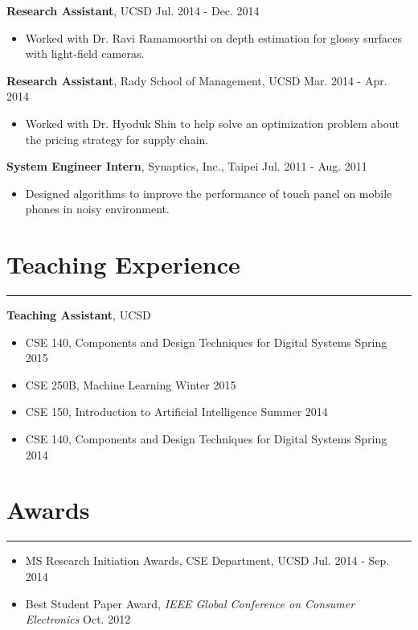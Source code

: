 \documentclass[10pt,letterpaper]{article}
\begin{document}
\noindent 
{\bf Research Assistant}, UCSD \hfill Jul. 2014 - Dec. 2014
\begin{itemize}
\item Worked with Dr. Ravi Ramamoorthi on depth estimation for glossy surfaces with light-field cameras.
\end{itemize}
\vspace{5pt}

\noindent 
{\bf Research Assistant}, Rady School of Management, UCSD \hfill Mar. 2014 - Apr. 2014
\begin{itemize}
\item Worked with Dr. Hyoduk Shin to help solve an optimization problem about the pricing strategy for supply chain.%
\end{itemize}
\vspace{5pt}

\noindent 
{\bf System Engineer Intern}, Synaptics, Inc., Taipei \hfill Jul. 2011 - Aug. 2011 
\begin{itemize}
\item Designed algorithms to improve the performance of touch panel on mobile phones in noisy environment.
\end{itemize}

\section*{Teaching Experience} \vspace{-5pt}
\hrule \vspace{10pt}
{\bf Teaching Assistant}, UCSD
\begin{itemize}
\item CSE 140, Components and Design Techniques for Digital Systems \hfill Spring 2015
\item CSE 250B, Machine Learning \hfill Winter 2015
\item CSE 150, Introduction to Artificial Intelligence \hfill Summer 2014
\item CSE 140, Components and Design Techniques for Digital Systems \hfill Spring 2014
\end{itemize}

\section*{Awards} \vspace{-5pt}
\hrule \vspace{10pt}				
\begin{itemize}  \itemsep 2pt
\item MS Research Initiation Awards, CSE Department, UCSD \hfill Jul. 2014 - Sep. 2014
\item Best Student Paper Award, {\it IEEE Global Conference on Consumer Electronics} \hfill Oct. 2012 
\end{itemize}
\end{document}
